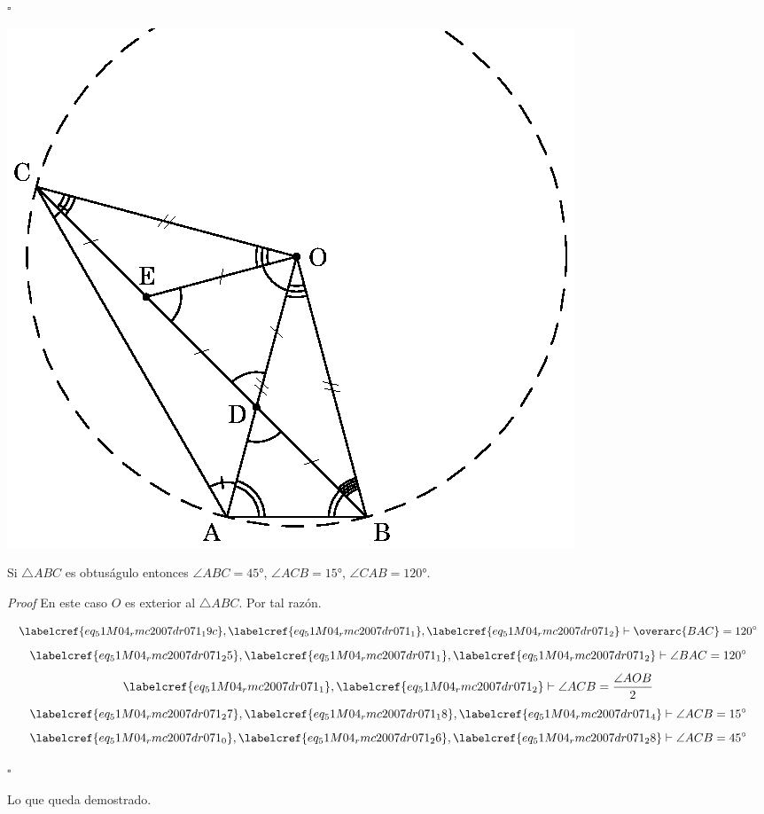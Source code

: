\hfill $\square$

\includegraphics{share/euk/51M04_rmc2007dr071_2.eps}

\begin{claim}
	Si $\triangle{ABC}$ es obtuságulo entonces $\angle{ABC} = \ang{45}$, $\angle{ACB} = \ang{15}$, $\angle{CAB} = \ang{120}$.
\end{claim}
\textit{Proof}
En este caso $O$ es exterior al $\triangle{ABC}$. Por tal razón.

\begin{equation} \label{eq_51M04_rmc2007dr071_25}
	\labelcref{eq_51M04_rmc2007dr071_19c}, \labelcref{eq_51M04_rmc2007dr071_1}, \labelcref{eq_51M04_rmc2007dr071_2} \vdash \overarc{BAC} = \ang{120}
\end{equation}
\begin{equation} \label{eq_51M04_rmc2007dr071_26}
	\labelcref{eq_51M04_rmc2007dr071_25}, \labelcref{eq_51M04_rmc2007dr071_1}, \labelcref{eq_51M04_rmc2007dr071_2} \vdash \angle{BAC} = \ang{120}
\end{equation}
\begin{equation} \label{eq_51M04_rmc2007dr071_27}
	\labelcref{eq_51M04_rmc2007dr071_1}, \labelcref{eq_51M04_rmc2007dr071_2} \vdash \angle{ACB} = \frac{\angle{AOB}}{2}
\end{equation}
\begin{equation} \label{eq_51M04_rmc2007dr071_28}
	\labelcref{eq_51M04_rmc2007dr071_27}, \labelcref{eq_51M04_rmc2007dr071_18}, \labelcref{eq_51M04_rmc2007dr071_4} \vdash \angle{ACB} = \ang{15}
\end{equation}
\begin{equation} \label{eq_51M04_rmc2007dr071_29}
	\labelcref{eq_51M04_rmc2007dr071_0}, \labelcref{eq_51M04_rmc2007dr071_26}, \labelcref{eq_51M04_rmc2007dr071_28} \vdash \angle{ACB} = \ang{45}
\end{equation}

\hfill $\square$

\vspace{1cm}
Lo que queda demostrado. \\\\\\
